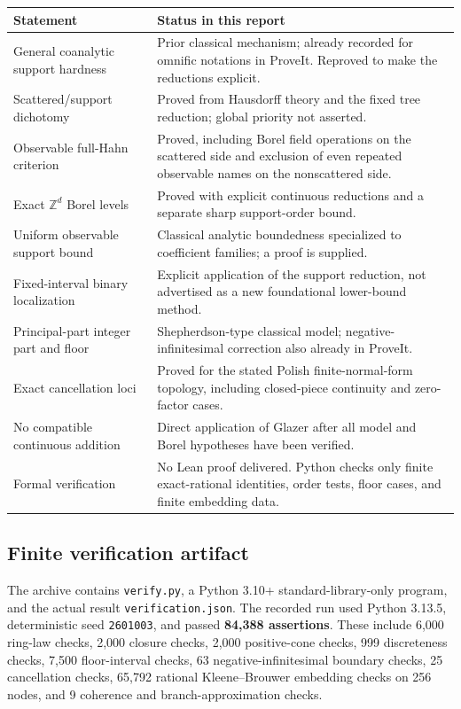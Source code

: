 \documentclass[11pt]{article}
\numberwithin{equation}{section}
\theoremstyle{definition}
\theoremstyle{remark}
\newcommand{\Z}{\mathbb Z}
\begin{document}
\renewcommand{\arraystretch}{1.2}
\begin{longtable}{@{}>{\raggedright\arraybackslash}p{}>{\raggedright\arraybackslash}p{}@{}}
\toprule
Statement & Status in this report\\
\midrule
\endhead
General coanalytic support hardness & Prior classical mechanism; already
recorded for omnific notations in ProveIt. Reproved to make the reductions explicit.\\
Scattered/support dichotomy & Proved from Hausdorff theory and the fixed tree
reduction; global priority not asserted.\\
Observable full-Hahn criterion & Proved, including Borel field operations on
the scattered side and exclusion of even repeated observable names on the
nonscattered side.\\
Exact $\Z^d$ Borel levels & Proved with explicit continuous reductions and a
separate sharp support-order bound.\\
Uniform observable support bound & Classical analytic boundedness specialized
to coefficient families; a proof is supplied.\\
Fixed-interval binary localization & Explicit application of the support
reduction, not advertised as a new foundational lower-bound method.\\
Principal-part integer part and floor & Shepherdson-type classical model;
negative-infinitesimal correction also already in ProveIt.\\
Exact cancellation loci & Proved for the stated Polish finite-normal-form
topology, including closed-piece continuity and zero-factor cases.\\
No compatible continuous addition & Direct application of Glazer after all
model and Borel hypotheses have been verified.\\
Formal verification & No Lean proof delivered. Python checks only finite
exact-rational identities, order tests, floor cases, and finite embedding data.\\
\bottomrule
\end{longtable}

\subsection{Finite verification artifact}

The archive contains \texttt{verify.py}, a Python 3.10+ standard-library-only
program, and the actual result \texttt{verification.json}. The recorded run
used Python 3.13.5, deterministic seed \texttt{2601003}, and passed
\textbf{84,388 assertions}. These include 6,000 ring-law checks, 2,000 closure
checks, 2,000 positive-cone checks, 999 discreteness checks, 7,500 floor-interval
checks, 63 negative-infinitesimal boundary checks, 25 cancellation checks,
65,792 rational Kleene--Brouwer embedding checks on 256 nodes, and 9 coherence
and branch-approximation checks.
\end{document}
